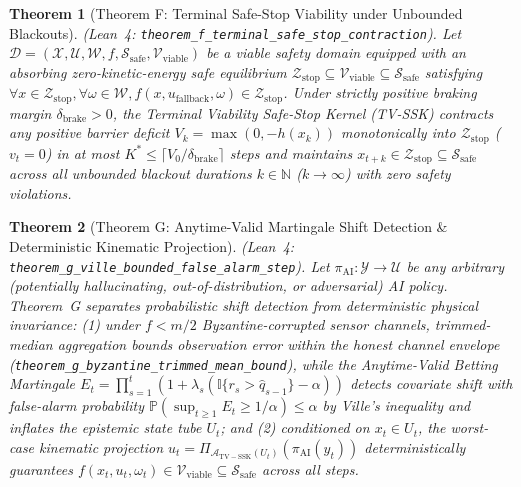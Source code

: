 \documentclass[conference]{IEEEtran}
\newtheorem{theorem}{Theorem}
\begin{document}
\begin{theorem}[Theorem F: Terminal Safe-Stop Viability under Unbounded Blackouts]
(Lean~4: \texttt{theorem\_f\_\allowbreak terminal\_\allowbreak safe\_stop\_\allowbreak contraction}). Let $\mathcal{D} = (\mathcal{X}, \mathcal{U}, \mathcal{W}, f, \mathcal{S}_{\mathrm{safe}}, \mathcal{V}_{\mathrm{viable}})$ be a viable safety domain equipped with an absorbing zero-kinetic-energy safe equilibrium $\mathcal{Z}_{\mathrm{stop}} \subseteq \mathcal{V}_{\mathrm{viable}} \subseteq \mathcal{S}_{\mathrm{safe}}$ satisfying $\forall x \in \mathcal{Z}_{\mathrm{stop}}, \forall \omega \in \mathcal{W}, f(x, u_{\mathrm{fallback}}, \omega) \in \mathcal{Z}_{\mathrm{stop}}$. Under strictly positive braking margin $\delta_{\mathrm{brake}}>0$, the Terminal Viability Safe-Stop Kernel (TV-SSK) contracts any positive barrier deficit $V_k=\max(0,-h(x_k))$ monotonically into $\mathcal{Z}_{\mathrm{stop}}$ ($v_t = 0$) in at most $K^* \le \lceil V_0/\delta_{\mathrm{brake}}\rceil$ steps and maintains $x_{t+k} \in \mathcal{Z}_{\mathrm{stop}} \subseteq \mathcal{S}_{\mathrm{safe}}$ across all unbounded blackout durations $k \in \mathbb{N}$ ($k \to \infty$) with zero safety violations.
\end{theorem}

\begin{theorem}[Theorem G: Anytime-Valid Martingale Shift Detection \& Deterministic Kinematic Projection]
(Lean~4: \texttt{theorem\_g\_\allowbreak ville\_\allowbreak bounded\_\allowbreak false\_alarm\_\allowbreak step}). Let $\pi_{\mathrm{AI}} : \mathcal{Y} \to \mathcal{U}$ be any arbitrary (potentially hallucinating, out-of-distribution, or adversarial) AI policy. Theorem~G separates probabilistic shift detection from deterministic physical invariance: (1) under $f < m/2$ Byzantine-corrupted sensor channels, trimmed-median aggregation bounds observation error within the honest channel envelope (\texttt{theorem\_g\_\allowbreak byzantine\_\allowbreak trimmed\_mean\_\allowbreak bound}), while the Anytime-Valid Betting Martingale $E_t = \prod_{s=1}^t (1 + \lambda_s (\mathbb{I}\{r_s > \hat{q}_{s-1}\} - \alpha))$ detects covariate shift with false-alarm probability $\mathbb{P}(\sup_{t\ge 1} E_t \ge 1/\alpha) \le \alpha$ by Ville's inequality \cite{ville_1939} and inflates the epistemic state tube $U_t$; and (2) conditioned on $x_t \in U_t$, the worst-case kinematic projection $u_t = \Pi_{\mathcal{A}_{\mathrm{TV-SSK}}(U_t)}(\pi_{\mathrm{AI}}(y_t))$ deterministically guarantees $f(x_t, u_t, \omega_t) \in \mathcal{V}_{\mathrm{viable}} \subseteq \mathcal{S}_{\mathrm{safe}}$ across all steps.
\end{theorem}
\end{document}
